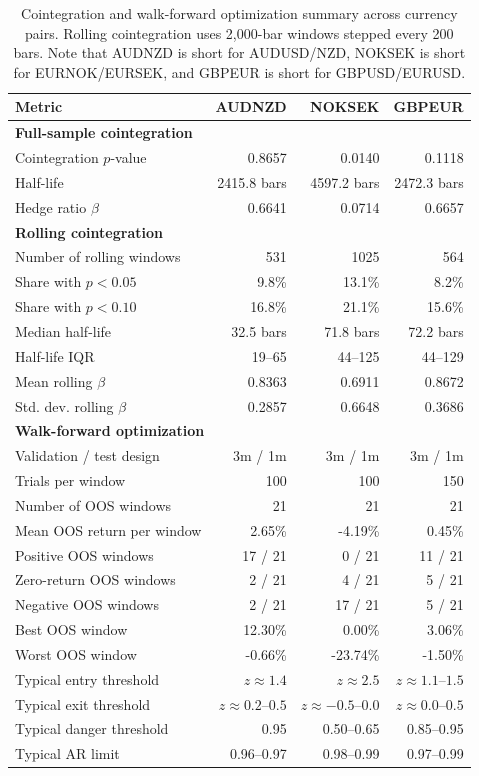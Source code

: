 \begin{table}[H]
\centering
\caption{Cointegration and walk-forward optimization summary across currency pairs. Rolling cointegration uses 2,000-bar windows stepped every 200 bars. Note that AUDNZD is short for AUDUSD/NZD, NOKSEK is short for EURNOK/EURSEK, and GBPEUR is short for GBPUSD/EURUSD.}
\label{tab:coint_wfo_all_pairs}
\small
\begin{tabularx}{\linewidth}{Xrrr}
\toprule
\textbf{Metric} & \textbf{AUDNZD} & \textbf{NOKSEK} & \textbf{GBPEUR} \\
\midrule
\multicolumn{4}{l}{\textbf{Full-sample cointegration}} \\
\midrule
Cointegration $p$-value & 0.8657 & 0.0140 & 0.1118 \\
Half-life & 2415.8 bars & 4597.2 bars & 2472.3 bars \\
Hedge ratio $\beta$ & 0.6641 & 0.0714 & 0.6657 \\
\midrule
\multicolumn{4}{l}{\textbf{Rolling cointegration}} \\
\midrule
Number of rolling windows & 531 & 1025 & 564 \\
Share with $p<0.05$ & 9.8\% & 13.1\% & 8.2\% \\
Share with $p<0.10$ & 16.8\% & 21.1\% & 15.6\% \\
Median half-life & 32.5 bars & 71.8 bars & 72.2 bars \\
Half-life IQR & 19--65 & 44--125 & 44--129 \\
Mean rolling $\beta$ & 0.8363 & 0.6911 & 0.8672 \\
Std. dev. rolling $\beta$ & 0.2857 & 0.6648 & 0.3686 \\
\midrule
\multicolumn{4}{l}{\textbf{Walk-forward optimization}} \\
\midrule
Validation / test design & 3m / 1m & 3m / 1m & 3m / 1m \\
Trials per window & 100 & 100 & 150 \\
Number of OOS windows & 21 & 21 & 21 \\
Mean OOS return per window & 2.65\% & -4.19\% & 0.45\% \\
Positive OOS windows & 17 / 21 & 0 / 21 & 11 / 21 \\
Zero-return OOS windows & 2 / 21 & 4 / 21 & 5 / 21 \\
Negative OOS windows & 2 / 21 & 17 / 21 & 5 / 21 \\
Best OOS window & 12.30\% & 0.00\% & 3.06\% \\
Worst OOS window & -0.66\% & -23.74\% & -1.50\% \\
Typical entry threshold & $z\approx1.4$ & $z\approx2.5$ & $z\approx1.1$--$1.5$ \\
Typical exit threshold & $z\approx0.2$--$0.5$ & $z\approx-0.5$--$0.0$ & $z\approx0.0$--$0.5$ \\
Typical danger threshold & 0.95 & 0.50--0.65 & 0.85--0.95 \\
Typical AR limit & 0.96--0.97 & 0.98--0.99 & 0.97--0.99 \\
\bottomrule
\end{tabularx}
\end{table}

